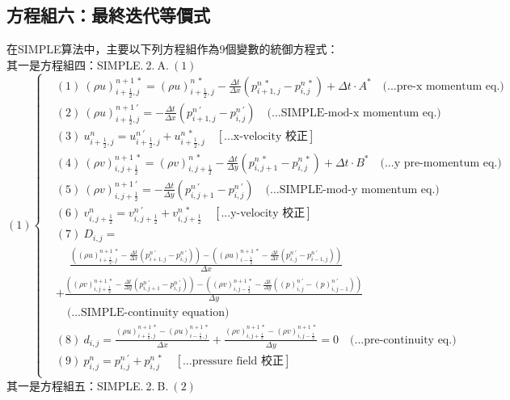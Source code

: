 \documentclass[12pt]{article}
\begin{document}
\subsection{方程組六：最終迭代等價式}
\label{subs:Final.s}
\noindent 在SIMPLE算法中，主要以下列方程組作為9個變數的統御方程式：\\
\noindent 其一是方程組四：SIMPLE.$\ $2.$\ $A.$\ $$(1)$\\[1.5ex]
\begin{equation}
(1)
\left\{
\begin{aligned}
    &(1)\ (\rho u)_{i+\frac{1}{2},j}^{n+1\ *} = (\rho u)_{i+\frac{1}{2},j}^{n\ *} - \frac{\Delta t}{\Delta x}(p_{i+1,j}^{n\ *} - p_{i,j}^{n\ *}) + \Delta t \cdot A^{*}  \quad \text{(...pre-x momentum eq.)}\\[1.5ex]
    &(2)\ (\rho u)_{i+\frac{1}{2},j}^{n+1\ \prime} = - \frac{\Delta t}{\Delta x}(p_{i+1,j}^{n\ \prime} - p_{i,j}^{n\ \prime})  \quad \text{(...SIMPLE-mod-x momentum eq.)}\\[1.5ex]
    &(3)\ u_{i+\frac{1}{2},j}^{n} = u_{i+\frac{1}{2},j}^{n\ \prime} + u_{i+\frac{1}{2},j}^{n\ *}  \quad \left[\text{...x-velocity 校正}\right]\\[1.5ex]
    &(4)\ (\rho v)_{i,j+\frac{1}{2}}^{n+1\ *} = (\rho v)_{i,j+\frac{1}{2}}^{n\ *} - \frac{\Delta t}{\Delta y}(p_{i,j+1}^{n\ *} - p_{i,j}^{n\ *}) + \Delta t \cdot B^{*}  \quad \text{(...y pre-momentum eq.)}\\[1.5ex]
    &(5)\ (\rho v)_{i,j+\frac{1}{2}}^{n+1\ \prime} =  - \frac{\Delta t}{\Delta y}(p_{i,j+1}^{n\ \prime} - p_{i,j}^{n\ \prime}) \quad \text{(...SIMPLE-mod-y momentum eq.)}\\[1.5ex]
    &(6)\ v_{i,j+\frac{1}{2}}^{n} = v_{i,j+\frac{1}{2}}^{n\ \prime} + v_{i,j+\frac{1}{2}}^{n\ *} \quad \left[\text{...y-velocity 校正}\right]\\[1.5ex]
    &(7)\ D_{i,j} =\\[1.5ex]
        &\quad \ \frac{((\rho u)_{i+\frac{1}{2},j}^{n+1\ *} - \frac{\Delta t}{\Delta x}(p_{i+1,j}^{n\ \prime} - p_{i,j}^{n\ \prime})) - ((\rho u)_{i-\frac{1}{2}}^{n+1\ *} - \frac{\Delta t}{\Delta x}(p_{i,j}^{n\ \prime} - p_{i-1,j}^{n\ \prime})) }{\Delta x}\\[1.5ex]
        &+\frac{((\rho v)_{i,j+\frac{1}{2}}^{n+1\ *}- \frac{\Delta t}{\Delta y}(p_{i,j+1}^{n\ \prime} - p_{i,j}^{n\ \prime})) - ((\rho v)_{i,j-\frac{1}{2}}^{n+1\ *}-\frac{\Delta t}{\Delta y}((p)_{i,j}^{n\ \prime} - (p)_{i,j-1}^{n\ \prime}))}{\Delta y}\\[1.5ex]
        &\quad \text{(...SIMPLE-continuity equation)}\\[1.5ex]
    &(8)\ d_{i,j} = \frac{(\rho u)_{i+\frac{1}{2},j}^{n+1\ *} - (\rho u)_{i-\frac{1}{2},j}^{n+1\ *}}{\Delta x} + \frac{(\rho v)_{i,j+\frac{1}{2}}^{n+1\ *} - (\rho v)_{i,j-\frac{1}{2}}^{n+1\ *}}{\Delta y} = 0 \quad \text{(...pre-continuity eq.)}\\[1.5ex]
    &(9)\ p_{i,j}^{n} = p_{i,j}^{n\ \prime} + p_{i,j}^{n\ *} \quad\left[\text{...pressure field 校正}\right]\\[1.5ex]
\end{aligned}
\right.
\label{eq:Final.1}
\end{equation}
\newpage
\noindent 其一是方程組五：SIMPLE.$\ $2.$\ $B.$\ $$(2)$\\[1.5ex]
\end{document}
